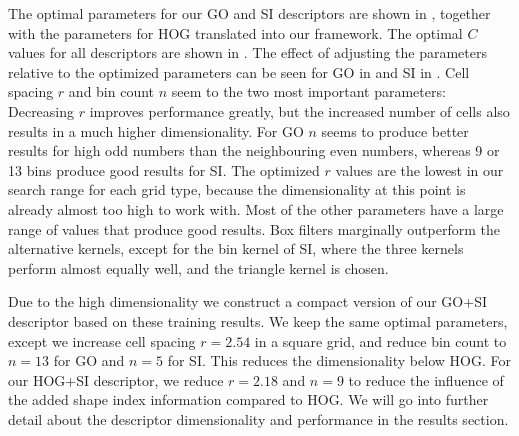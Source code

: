 \documentclass[thesis.tex]{subfiles}
\begin{document}
The optimal parameters for our GO and SI descriptors are shown in , together with the parameters for HOG translated into our framework. The optimal $C$ values for all descriptors are shown in . The effect of adjusting the parameters relative to the optimized parameters can be seen for GO in  and SI in . Cell spacing $r$ and bin count $n$ seem to the two most important parameters: Decreasing $r$ improves performance greatly, but the increased number of cells also results in a much higher dimensionality. For GO $n$ seems to produce better results for high odd numbers than the neighbouring even numbers, whereas 9 or 13 bins produce good results for SI. The optimized $r$ values are the lowest in our search range for each grid type, because the dimensionality at this point is already almost too high to work with. Most of the other parameters have a large range of values that produce good results. Box filters marginally outperform the alternative kernels, except for the bin kernel of SI, where the three kernels perform almost equally well, and the triangle kernel is chosen.

Due to the high dimensionality we construct a compact version of our GO+SI descriptor based on these training results. We keep the same optimal parameters, except we increase cell spacing $r = 2.54$ in a square grid, and reduce bin count to $n = 13$ for GO and $n = 5$ for SI. This reduces the dimensionality below HOG. For our HOG+SI descriptor, we reduce $r = 2.18$ and $n = 9$ to reduce the influence of the added shape index information compared to HOG. We will go into further detail about the descriptor dimensionality and performance in the results section.
\end{document}
